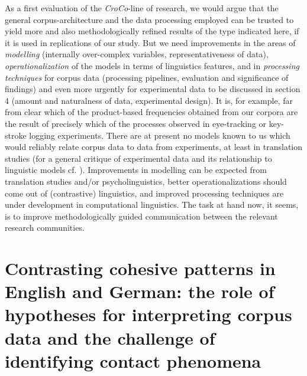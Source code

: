 \documentclass[output=paper]{LSP/langsci}
\begin{document}
As a first evaluation of the \textit{CroCo}{}-line of research, we would argue that the general corpus-architecture and the data processing employed can be trusted to yield more and also methodologically refined results of the type indicated here, if it is used in replications of our study. But we need improvements in the areas of \textit{modelling} (internally over-complex variables, representativeness of data), \textit{operationalization} of the models in terms of linguistics features, and in \textit{processing techniques} for corpus data (processing pipelines, evaluation and significance of findings) and even more urgently for experimental data to be discussed in section 4 (amount and naturalness of data, experimental design). It is, for example, far from clear which of the product-based frequencies obtained from our corpora are the result of precisely which of the processes observed in eye-tracking or key-stroke logging experiments. There are at present no models known to us which would reliably relate corpus data to data from experiments, at least in translation studies (for a general critique of experimental data and its relationship to linguistic models cf. \citealt{Schlesewsky2009}). Improvements in modelling can be expected from translation studies and/or psycholinguistics, better operationalizations should come out of (contrastive) linguistics, and improved processing techniques are under development in computational linguistics. The task at hand now, it seems, is to improve methodologically guided communication between the relevant research communities. 

\section{Contrasting cohesive patterns in English and German: the role of hypotheses for interpreting corpus data and the challenge of identifying contact phenomena}\label{sec:steiner:3}
\end{document}
